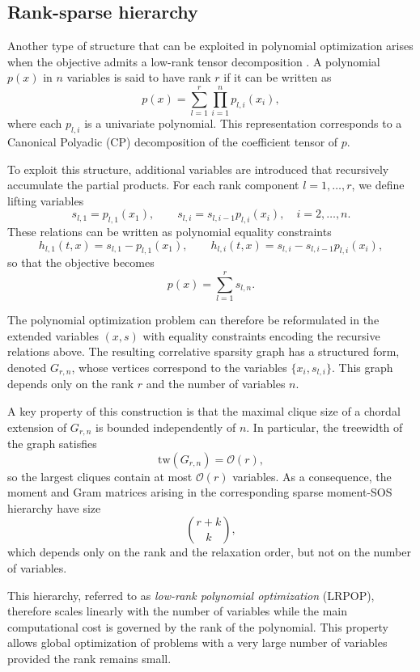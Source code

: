 \documentclass[11pt,a4paper]{article}
\theoremstyle{definition}
\begin{document}
\subsection{Rank-sparse hierarchy}\label{sec:lrpop}

Another type of structure that can be exploited in polynomial
optimization arises when the objective admits a low-rank tensor
decomposition \cite{LRPOP25}. A polynomial $p(x)$ in $n$ variables is said to
have rank $r$ if it can be written as
\begin{equation}\label{eq:cp_poly}
p(x) = \sum_{l=1}^r \prod_{i=1}^n p_{l,i}(x_i),
\end{equation}
where each $p_{l,i}$ is a univariate polynomial.
This representation corresponds to a Canonical Polyadic (CP)
decomposition of the coefficient tensor of $p$.

To exploit this structure, additional variables are introduced that
recursively accumulate the partial products. For each rank component
$l=1,\dots,r$, we define lifting variables
\[
s_{l,1}=p_{l,1}(x_1), \qquad
s_{l,i}=s_{l,i-1}p_{l,i}(x_i), \quad i=2,\dots,n .
\]
These relations can be written as polynomial equality constraints
\[
h_{l,1}(t,x)=s_{l,1}-p_{l,1}(x_1), \qquad
h_{l,i}(t,x)=s_{l,i}-s_{l,i-1}p_{l,i}(x_i),
\]
so that the objective becomes
\[
p(x)=\sum_{l=1}^r s_{l,n}.
\]

The polynomial optimization problem can therefore be reformulated in the
extended variables $(x,s)$ with equality constraints
encoding the recursive relations above.
The resulting correlative sparsity graph has a structured form,
denoted $G_{r,n}$, whose vertices correspond to the variables
$\{x_i,s_{l,i}\}$.
This graph depends only on the rank $r$ and the number of variables $n$.

A key property of this construction is that the maximal clique size of a
chordal extension of $G_{r,n}$ is bounded independently of $n$.
In particular, the treewidth of the graph satisfies
\[
\mathrm{tw}(G_{r,n}) = \mathcal{O}(r),
\]
so the largest cliques contain at most $\mathcal{O}(r)$ variables.
As a consequence, the moment and Gram matrices arising in the
corresponding sparse moment-SOS hierarchy have size
\[
\binom{r+k}{k},
\]
which depends only on the rank and the relaxation order, but not on the
number of variables.

This hierarchy, referred to as \emph{low-rank polynomial optimization}
(LRPOP), therefore scales linearly with the number of variables while
the main computational cost is governed by the rank of the polynomial.
This property allows global optimization of problems with a very large
number of variables provided the rank remains small.
\end{document}
